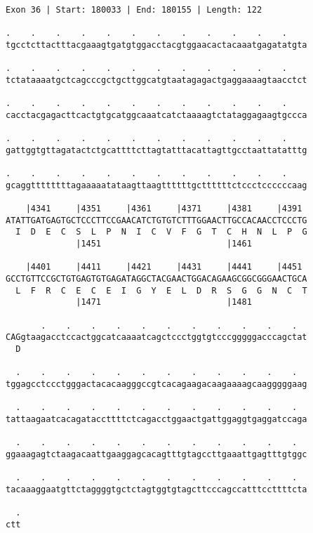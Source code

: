 \documentclass{article}
\begin{document}
\begin{Verbatim}
Exon 36 | Start: 180033 | End: 180155 | Length: 122
 
.    .    .    .    .    .    .    .    .    .    .    .    
tgcctcttactttacgaaagtgatgtggacctacgtggaacactacaaatgagatatgta
  
.    .    .    .    .    .    .    .    .    .    .    .    
tctataaaatgctcagcccgctgcttggcatgtaatagagactgaggaaaagtaacctct
  
.    .    .    .    .    .    .    .    .    .    .    .    
cacctacgagacttcactgtgcatggcaaatcatctaaaagtctataggagaagtgccca
  
.    .    .    .    .    .    .    .    .    .    .    .    
gattggtgttagatactctgcattttcttagtatttacattagttgcctaattatatttg
  
.    .    .    .    .    .    .    .    .    .    .    .    
gcaggttttttttagaaaaatataagttaagttttttgcttttttctccctccccccaag
  
    |4341     |4351     |4361     |4371     |4381     |4391 
ATATTGATGAGTGCTCCCTTCCGAACATCTGTGTCTTTGGAACTTGCCACAACCTCCCTG
  I  D  E  C  S  L  P  N  I  C  V  F  G  T  C  H  N  L  P  G
              |1451                         |1461           
  
    |4401     |4411     |4421     |4431     |4441     |4451 
GCCTGTTCCGCTGTGAGTGTGAGATAGGCTACGAACTGGACAGAAGCGGCGGGAACTGCA
  L  F  R  C  E  C  E  I  G  Y  E  L  D  R  S  G  G  N  C  T
              |1471                         |1481           
  
       .    .    .    .    .    .    .    .    .    .    .  
CAGgtaagacctccactggcatcaaaatcagctccctggtgtcccgggggacccagctat
  D                                                         
  
  .    .    .    .    .    .    .    .    .    .    .    .  
tggagcctccctgggactacacaagggccgtcacagaagacaagaaaagcaagggggaag
  
  .    .    .    .    .    .    .    .    .    .    .    .  
tattaagaatcacagataccttttctcagacctggaactgattggaggtgaggatccaga
  
  .    .    .    .    .    .    .    .    .    .    .    .  
ggaaagagtctaagacaattgaaggagcacagtttgtagccttgaaattgagtttgtggc
  
  .    .    .    .    .    .    .    .    .    .    .    .  
tacaaaggaatgttctaggggtgctctagtggtgtagcttcccagccatttccttttcta
  
  .
ctt
\end{Verbatim}
\newpage
\end{document}
